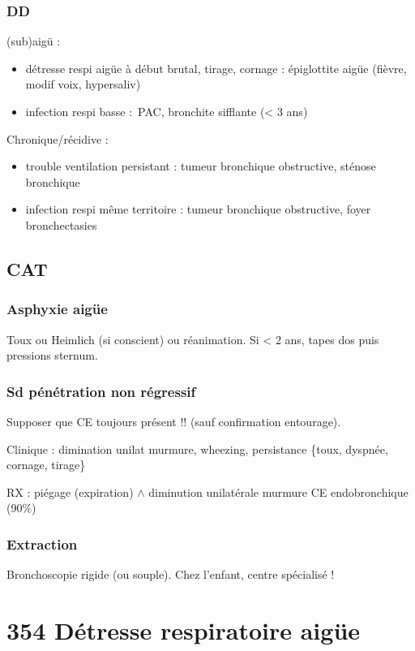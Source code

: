 \documentclass{book}
\begin{document}
\subsubsection{DD}
\label{sec:org959428e}
(sub)aigü : 

\begin{itemize}
\item détresse respi aigüe à début brutal, tirage, cornage : épiglottite aigüe
(fièvre, modif voix, hypersaliv)
\item infection respi basse : PAC, bronchite sifflante (< 3 ans)
\end{itemize}

Chronique/récidive :

\begin{itemize}
\item trouble ventilation persistant : tumeur bronchique obstructive, sténose
bronchique
\item infection respi même territoire : tumeur bronchique obstructive, foyer
bronchectasies
\end{itemize}


\subsection{CAT}
\label{sec:org4162a1c}
\subsubsection{Asphyxie aigüe}
\label{sec:orge8f1660}
Toux ou Heimlich (si conscient) ou réanimation. Si < 2 ans, tapes dos puis
pressions sternum.
\subsubsection{Sd pénétration non régressif}
\label{sec:org0fa134e}
Supposer que CE toujours présent !! (sauf confirmation entourage). 

Clinique : dimination unilat murmure, wheezing, persistance \{toux, dyspnée,
  cornage, tirage\}

RX  : piégage (expiration) \(\wedge\) diminution unilatérale murmure \thus CE
endobronchique (90\%)

\subsubsection{Extraction}
\label{sec:org942c942}
Bronchoscopie rigide (ou souple). Chez l'enfant, centre spécialisé !

\section{354 \textdagger{} Détresse respiratoire aigüe}
\label{sec:org6e717a4}
\label{org0000afb}
\end{document}

